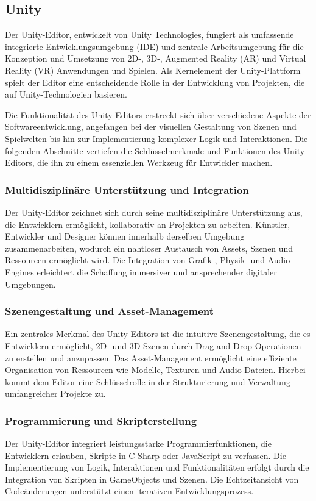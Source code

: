 \subsection{Unity}
Der Unity-Editor, entwickelt von Unity Technologies, fungiert als umfassende integrierte Entwicklungsumgebung (IDE)
und zentrale Arbeitsumgebung für die Konzeption und Umsetzung von 2D-, 3D-, Augmented Reality (AR) und Virtual Reality
(VR) Anwendungen und Spielen. Als Kernelement der Unity-Plattform spielt der Editor eine entscheidende Rolle in der
Entwicklung von Projekten, die auf Unity-Technologien basieren.

Die Funktionalität des Unity-Editors erstreckt sich über verschiedene Aspekte der Softwareentwicklung, angefangen bei
der visuellen Gestaltung von Szenen und Spielwelten bis hin zur Implementierung komplexer Logik und Interaktionen. Die
folgenden Abschnitte vertiefen die Schlüsselmerkmale und Funktionen des Unity-Editors, die ihn zu einem essenziellen
Werkzeug für Entwickler machen.

\subsubsection{Multidisziplinäre Unterstützung und Integration}
Der Unity-Editor zeichnet sich durch seine multidisziplinäre Unterstützung aus, die Entwicklern ermöglicht, kollaborativ
an Projekten zu arbeiten. Künstler, Entwickler und Designer können innerhalb derselben Umgebung zusammenarbeiten,
wodurch ein nahtloser Austausch von Assets, Szenen und Ressourcen ermöglicht wird. Die Integration von Grafik-,
Physik- und Audio-Engines erleichtert die Schaffung immersiver und ansprechender digitaler Umgebungen.

\subsubsection{Szenengestaltung und Asset-Management}
Ein zentrales Merkmal des Unity-Editors ist die intuitive Szenengestaltung, die es Entwicklern ermöglicht,
2D- und 3D-Szenen durch Drag-and-Drop-Operationen zu erstellen und anzupassen. Das Asset-Management ermöglicht eine
effiziente Organisation von Ressourcen wie Modelle, Texturen und Audio-Dateien. Hierbei kommt dem Editor eine
Schlüsselrolle in der Strukturierung und Verwaltung umfangreicher Projekte zu.

\subsubsection{Programmierung und Skripterstellung}
Der Unity-Editor integriert leistungsstarke Programmierfunktionen, die Entwicklern erlauben, Skripte in C-Sharp oder
JavaScript zu verfassen. Die Implementierung von Logik, Interaktionen und Funktionalitäten erfolgt durch die
Integration von Skripten in GameObjects und Szenen. Die Echtzeitansicht von Codeänderungen unterstützt einen
iterativen Entwicklungsprozess.

